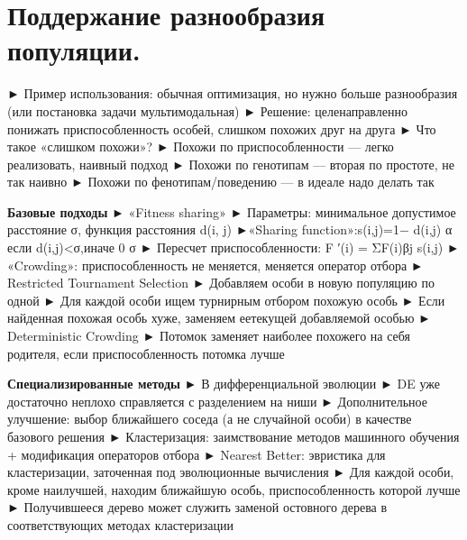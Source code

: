 \section{Поддержание разнообразия популяции.}


► Пример использования: обычная оптимизация, но нужно больше разнообразия (или постановка задачи мультимодальная)
► Решение: целенаправленно понижать приспособленность особей, слишком похожих друг на друга
► Что такое «слишком похожи»?
► Похожи по приспособленности — легко реализовать, наивный подход ► Похожи по генотипам — вторая по простоте, не так наивно
► Похожи по фенотипам/поведению — в идеале надо делать так


\textbf{Базовые подходы}
► «Fitness sharing»
► Параметры: минимальное допустимое расстояние σ, функция расстояния d(i, j)
►«Sharing function»:s(i,j)=1− d(i,j) α если d(i,j)<σ,иначе 0 σ
► Пересчет приспособленности: F ′(i) = ΣF(i)βj s(i,j)
► «Crowding»: приспособленность не меняется, меняется оператор отбора 
► Restricted Tournament Selection
► Добавляем особи в новую популяцию по одной
► Для каждой особи ищем турнирным отбором похожую особь
► Если найденная похожая особь хуже, заменяем еетекущей добавляемой особью
► Deterministic Crowding
► Потомок заменяет наиболее похожего на себя родителя, если приспособленность потомка лучше

\textbf{Специализированные методы}
► В дифференциальной эволюции
► DE уже достаточно неплохо справляется с разделением на ниши
► Дополнительное улучшение: выбор ближайшего соседа (а не случайной особи)
в качестве базового решения
► Кластеризация: заимствование методов машинного обучения + модификация
операторов отбора
► Nearest Better: эвристика для кластеризации, заточенная под эволюционные вычисления
► Для каждой особи, кроме наилучшей, находим ближайшую особь, приспособленность которой лучше
► Получившееся дерево может служить заменой остовного дерева в соответствующих методах кластеризации